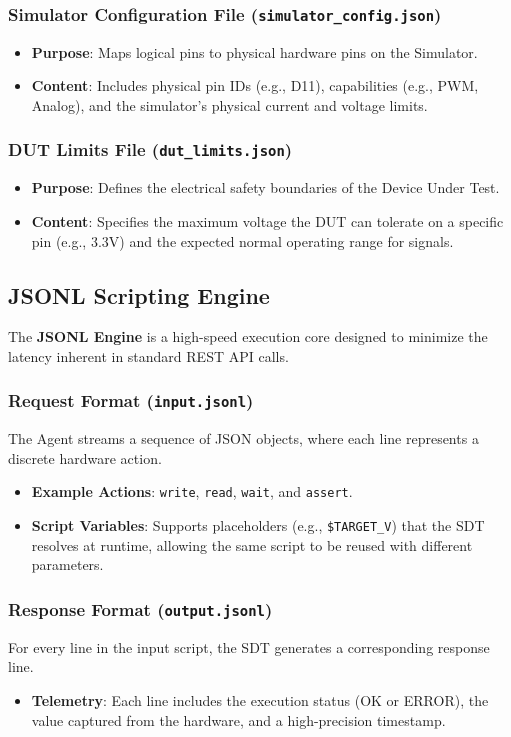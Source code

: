 \documentclass[conference]{IEEEtran}
\begin{document}
\subsubsection{Simulator Configuration File (\texttt{simulator\_config.json})}
\begin{itemize}
    \item \textbf{Purpose}: Maps logical pins to physical hardware pins on the Simulator.
    \item \textbf{Content}: Includes physical pin IDs (e.g., D11), capabilities (e.g., PWM, Analog), and the simulator's physical current and voltage limits.
\end{itemize}
\subsubsection{DUT Limits File (\texttt{dut\_limits.json})}
\begin{itemize}
    \item \textbf{Purpose}: Defines the electrical safety boundaries of the Device Under Test.
    \item \textbf{Content}: Specifies the maximum voltage the DUT can tolerate on a specific pin (e.g., 3.3V) and the expected normal operating range for signals.
\end{itemize}

\subsection{JSONL Scripting Engine}
The \textbf{JSONL Engine} is a high-speed execution core designed to minimize the latency inherent in standard REST API calls.
\subsubsection{Request Format (\texttt{input.jsonl})}
The Agent streams a sequence of JSON objects, where each line represents a discrete hardware action.
\begin{itemize}
    \item \textbf{Example Actions}: \texttt{write}, \texttt{read}, \texttt{wait}, and \texttt{assert}.
    \item \textbf{Script Variables}: Supports placeholders (e.g., \texttt{\$TARGET\_V}) that the SDT resolves at runtime, allowing the same script to be reused with different parameters.
\end{itemize}
\subsubsection{Response Format (\texttt{output.jsonl})}
For every line in the input script, the SDT generates a corresponding response line.
\begin{itemize}
    \item \textbf{Telemetry}: Each line includes the execution status (OK or ERROR), the value captured from the hardware, and a high-precision timestamp.
\end{itemize}
\end{document}
